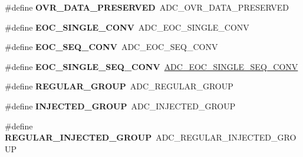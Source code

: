 \begin{DoxyCompactItemize}
\item 
\#define {\bfseries O\+V\+R\+\_\+\+D\+A\+T\+A\+\_\+\+P\+R\+E\+S\+E\+R\+V\+ED}~A\+D\+C\+\_\+\+O\+V\+R\+\_\+\+D\+A\+T\+A\+\_\+\+P\+R\+E\+S\+E\+R\+V\+ED\hypertarget{group___h_a_l___a_d_c___aliased___defines_ga1fb9c5eb49053187ac90c0af92662be6}{}\label{group___h_a_l___a_d_c___aliased___defines_ga1fb9c5eb49053187ac90c0af92662be6}

\item 
\#define {\bfseries E\+O\+C\+\_\+\+S\+I\+N\+G\+L\+E\+\_\+\+C\+O\+NV}~A\+D\+C\+\_\+\+E\+O\+C\+\_\+\+S\+I\+N\+G\+L\+E\+\_\+\+C\+O\+NV\hypertarget{group___h_a_l___a_d_c___aliased___defines_ga8160cf13a85d797ef96972174a863945}{}\label{group___h_a_l___a_d_c___aliased___defines_ga8160cf13a85d797ef96972174a863945}

\item 
\#define {\bfseries E\+O\+C\+\_\+\+S\+E\+Q\+\_\+\+C\+O\+NV}~A\+D\+C\+\_\+\+E\+O\+C\+\_\+\+S\+E\+Q\+\_\+\+C\+O\+NV\hypertarget{group___h_a_l___a_d_c___aliased___defines_gac7022f73c8906a37c7faf511bc720dda}{}\label{group___h_a_l___a_d_c___aliased___defines_gac7022f73c8906a37c7faf511bc720dda}

\item 
\#define {\bfseries E\+O\+C\+\_\+\+S\+I\+N\+G\+L\+E\+\_\+\+S\+E\+Q\+\_\+\+C\+O\+NV}~\hyperlink{group___a_d_c___e_o_c_selection_ga0cbb4e6ee76ee1bef233212bf947d320}{A\+D\+C\+\_\+\+E\+O\+C\+\_\+\+S\+I\+N\+G\+L\+E\+\_\+\+S\+E\+Q\+\_\+\+C\+O\+NV}\hypertarget{group___h_a_l___a_d_c___aliased___defines_ga503236c97697e9135a9d1c2c88cac7c9}{}\label{group___h_a_l___a_d_c___aliased___defines_ga503236c97697e9135a9d1c2c88cac7c9}

\item 
\#define {\bfseries R\+E\+G\+U\+L\+A\+R\+\_\+\+G\+R\+O\+UP}~A\+D\+C\+\_\+\+R\+E\+G\+U\+L\+A\+R\+\_\+\+G\+R\+O\+UP\hypertarget{group___h_a_l___a_d_c___aliased___defines_ga37bac62f24a8600f62d0d35683a0a4de}{}\label{group___h_a_l___a_d_c___aliased___defines_ga37bac62f24a8600f62d0d35683a0a4de}

\item 
\#define {\bfseries I\+N\+J\+E\+C\+T\+E\+D\+\_\+\+G\+R\+O\+UP}~A\+D\+C\+\_\+\+I\+N\+J\+E\+C\+T\+E\+D\+\_\+\+G\+R\+O\+UP\hypertarget{group___h_a_l___a_d_c___aliased___defines_gaa5d1cfe7b35cb724d898622cbd6b7894}{}\label{group___h_a_l___a_d_c___aliased___defines_gaa5d1cfe7b35cb724d898622cbd6b7894}

\item 
\#define {\bfseries R\+E\+G\+U\+L\+A\+R\+\_\+\+I\+N\+J\+E\+C\+T\+E\+D\+\_\+\+G\+R\+O\+UP}~A\+D\+C\+\_\+\+R\+E\+G\+U\+L\+A\+R\+\_\+\+I\+N\+J\+E\+C\+T\+E\+D\+\_\+\+G\+R\+O\+UP\hypertarget{group___h_a_l___a_d_c___aliased___defines_ga1e691aaec563e444d3965d5d98d1c47b}{}\label{group___h_a_l___a_d_c___aliased___defines_ga1e691aaec563e444d3965d5d98d1c47b}


\end{DoxyCompactItemize}

